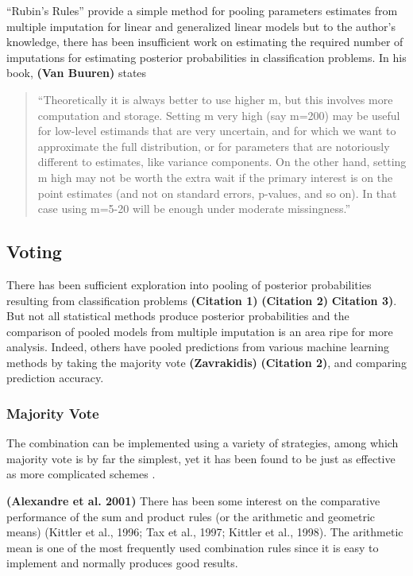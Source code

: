 \documentclass[12pt,]{article}
\begin{document}
``Rubin's Rules'' provide a simple method for pooling parameters
estimates from multiple imputation for linear and generalized linear
models but to the author's knowledge, there has been insufficient work
on estimating the required number of imputations for estimating
posterior probabilities in classification problems. In his book,
\textbf{(Van Buuren)} states

\begin{quote}
``Theoretically it is always better to use higher m, but this involves
more computation and storage. Setting m very high (say m=200) may be
useful for low-level estimands that are very uncertain, and for which we
want to approximate the full distribution, or for parameters that are
notoriously different to estimates, like variance components. On the
other hand, setting m high may not be worth the extra wait if the
primary interest is on the point estimates (and not on standard errors,
p-values, and so on). In that case using m=5-20 will be enough under
moderate missingness.''
\end{quote}

\subsection{Voting}\label{voting}

There has been sufficient exploration into pooling of posterior
probabilities resulting from classification problems \textbf{(Citation
1)} \textbf{(Citation 2)} \textbf{Citation 3)}. But not all statistical
methods produce posterior probabilities and the comparison of pooled
models from multiple imputation is an area ripe for more analysis.
Indeed, others have pooled predictions from various machine learning
methods by taking the majority vote \textbf{(Zavrakidis)}
\textbf{(Citation 2)}, and comparing prediction accuracy.

\subsubsection{Majority Vote}\label{majority-vote}

The combination can be implemented using a variety of strategies, among
which majority vote is by far the simplest, yet it has been found to be
just as effective as more complicated schemes \citep{lam_optimal_1995}.

\textbf{(Alexandre et al. 2001)} There has been some interest on the
comparative performance of the sum and product rules (or the arithmetic
and geometric means) (Kittler et al., 1996; Tax et al., 1997; Kittler et
al., 1998). The arithmetic mean is one of the most frequently used
combination rules since it is easy to implement and normally produces
good results.
\end{document}
